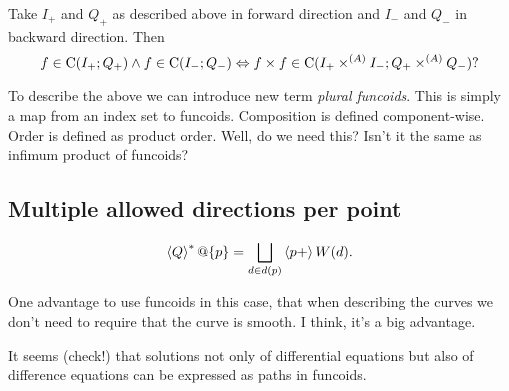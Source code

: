 Take $I_+$ and $Q_+$ as described above in forward direction and $I_-$ and $Q_-$ in backward direction. Then
\[ f\in\mathrm{C}(I_+;Q_+)\land f\in\mathrm{C}(I_-;Q_-) \Leftrightarrow f\times f\in\mathrm{C}(I_+\times^{(A)}I_-;Q_+\times^{(A)}Q_-)? \]

To describe the above we can introduce new term \emph{plural funcoids}. This is simply a map
from an index set to funcoids. Composition is defined component-wise. Order is defined as product order.
Well, do we need this? Isn't it the same as infimum product of funcoids?

\subsection{Multiple allowed directions per point}

\[ \rsupfun{Q}@\{p\} = \bigsqcup_{d\in d(p)} \supfun{p+} W(d). \]

One advantage to use funcoids in this case, that when describing the curves we don't need to require that the curve is smooth. I think, it's a big advantage.

It seems (check!) that solutions not only of differential equations but also of difference equations can be
expressed as paths in funcoids.
